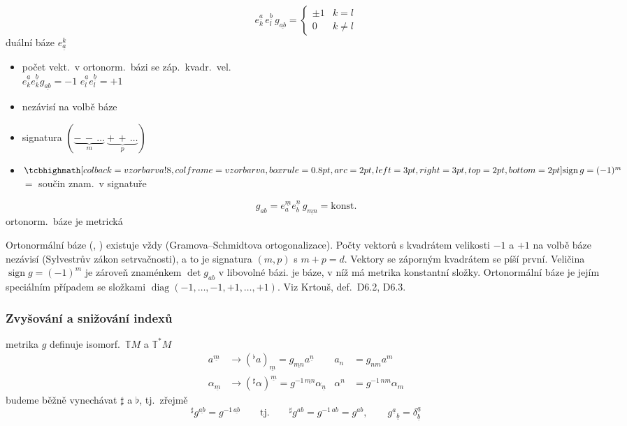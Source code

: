 \[
  e^{\underline{a}}_k\,e^{\underline{b}}_l\,g_{\underline{ab}} = \begin{cases} \pm1 & k = l \\ 0 & k\neq l\end{cases}
\]
\quad duální báze $e^k_{\underline{a}}$

\begin{itemize}[nosep]
  \item[] počet vekt.\ v ortonorm.\ bázi se záp.\ \hfill kvadr.\ vel. \\
          \quad $e^{\underline{a}}_k e^{\underline{b}}_k g_{\underline{ab}} = -1$ \qquad\qquad $e^{\underline{a}}_l e^{\underline{b}}_l = +1$
  \item[] nezávisí na volbě báze
  \item[$\to$] signatura \quad $(\underbrace{-\,-\,\dots}_{m}\ \underbrace{+\,+\,\dots}_{p})$
  \item[] $\vzorec{\operatorname{sign} g = (-1)^m}$ $=$ součin znam.\ v signatuře
\end{itemize}

\[
  g_{ab} = e^{\underline{m}}_a e^{\underline{n}}_b\,g_{\underline{mn}} = \text{konst.}
\]
\quad ortonorm.\ báze je metrická

\begin{vysvetleni}
Ortonormální báze (, ) existuje vždy (Gramova--Schmidtova ortogonalizace). Počty vektorů s kvadrátem velikosti $-1$ a $+1$ na volbě báze nezávisí (Sylvestrův zákon setrvačnosti), a to je signatura $(m,p)$ s $m+p=d$. Vektory se záporným kvadrátem se píší první. Veličina $\operatorname{sign}g=(-1)^m$ je zároveň znaménkem $\det g_{ab}$ v libovolné bázi.
 je báze, v níž má metrika konstantní složky. Ortonormální báze je jejím speciálním případem se složkami $\operatorname{diag}(-1,\dots,-1,+1,\dots,+1)$.
Viz Krtouš, def.~D6.2, D6.3.
\end{vysvetleni}

\subsubsection*{Zvyšování a snižování indexů} 
metrika $g$ definuje isomorf.\ $\mathbb{T}M$ a $\mathbb{T}^*M$
\begin{align*}
  a^{\underline{m}} &\to ({}^\flat a)_{\underline{m}} = g_{\underline{mn}}a^{\underline{n}} & a_n &= g_{nm}a^m \\
  \alpha_{\underline{m}} &\to ({}^\sharp\alpha)^{\underline{m}} = g^{-1\,\underline{mn}}\alpha_{\underline{n}} & \alpha^n &= g^{-1\,nm}\alpha_m
\end{align*}
budeme běžně vynechávat $\sharp$ a $\flat$, tj.\ \quad zřejmě
\[
  {}^\sharp g^{\underline{ab}} = g^{-1\,\underline{ab}} \qquad\text{tj.}\qquad {}^\sharp g^{ab} = g^{-1\,ab} = g^{ab}, \qquad g^{\underline{a}}{}_{\underline{b}} = \delta^{\underline{a}}_{\underline{b}}
\]

